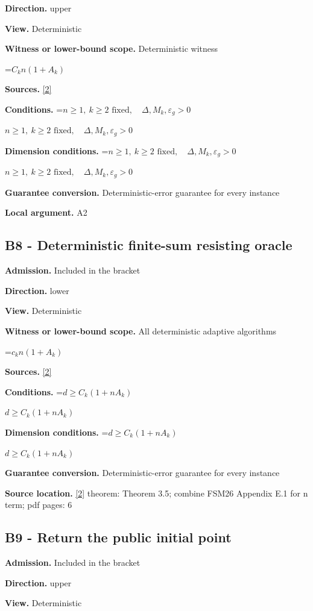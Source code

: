 \documentclass[10pt,a4paper]{article}
\newcommand{\AtlasMath}[1]{\par\begingroup\centering\setbox0=\hbox{$\displaystyle #1$}\ifdim\wd0>1.4\linewidth\typeout{ATLAS WIDE FORMULA: \the\wd0}\fi\ifdim\wd0>\linewidth\resizebox{\linewidth}{!}{\box0}\else\box0\fi\par\endgroup}
\newcommand{\AtlasInlineMath}[1]{\begingroup\setbox0=\hbox{$#1$}\ifdim\wd0>.4\linewidth\endgroup\AtlasMath{#1}\else\endgroup$#1$\fi}
\begin{document}
\textbf{Direction.} upper

\textbf{View.} Deterministic

\textbf{Witness or lower-bound scope.} Deterministic witness

\AtlasMath{C_k n(1+A_k)}
\textbf{Sources.} \href{https://proceedings.mlr.press/v151/emmenegger22a/emmenegger22a.pdf}{[2]}

\textbf{Conditions.} \AtlasInlineMath{n\ge1,\ k\ge2\text{ fixed},\quad\Delta,M_k,\varepsilon_g>0}

\textbf{Dimension conditions.} \AtlasInlineMath{n\ge1,\ k\ge2\text{ fixed},\quad\Delta,M_k,\varepsilon_g>0}

\textbf{Guarantee conversion.} Deterministic-error guarantee for every instance

\textbf{Local argument.} A2

\subsection{B8 - Deterministic finite-sum resisting oracle}
\textbf{Admission.} Included in the bracket

\textbf{Direction.} lower

\textbf{View.} Deterministic

\textbf{Witness or lower-bound scope.} All deterministic adaptive algorithms

\AtlasMath{c_k n(1+A_k)}
\textbf{Sources.} \href{https://proceedings.mlr.press/v151/emmenegger22a/emmenegger22a.pdf}{[2]}

\textbf{Conditions.} \AtlasInlineMath{d\ge C_k(1+nA_k)}

\textbf{Dimension conditions.} \AtlasInlineMath{d\ge C_k(1+nA_k)}

\textbf{Guarantee conversion.} Deterministic-error guarantee for every instance

\textbf{Source location.} \href{https://proceedings.mlr.press/v151/emmenegger22a/emmenegger22a.pdf}{[2]} theorem: Theorem 3.5; combine FSM26 Appendix E.1 for n term; pdf pages: 6

\subsection{B9 - Return the public initial point}
\textbf{Admission.} Included in the bracket

\textbf{Direction.} upper

\textbf{View.} Deterministic
\end{document}
